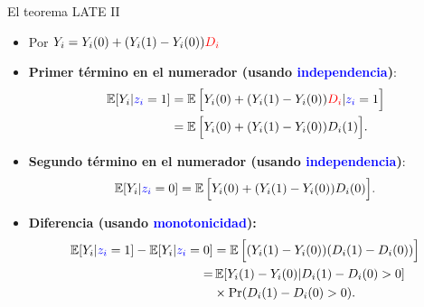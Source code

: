 \documentclass[10pt, xcolor=dvipsnames]{beamer}
\begin{document}
\begin{frame}{El teorema LATE II}\label{ANEX:TEOR-LATE2}
\begin{itemize}
    \item Por \text{\textbf{\textcolor{blue}{restricción de exclusión}}} \(Y_i = Y_i(0)+ (Y_i(1)-Y_i(0))\textcolor{red}{D_i} \)
    \vspace{1em}
    \item \textbf{Primer término en el numerador (usando \textcolor{blue}{independencia})}:
    {\small
    \begin{align}
    \begin{split}
    \operatorname{\mathbb{E}}[Y_i|\textcolor{blue}{z_i} =1] &= \operatorname{\mathbb{E}}\Big[Y_i(0)+ (Y_i(1)-Y_i(0))\textcolor{red}{D_i}|\textcolor{blue}{z_i} =1\Big] \\
    &= \operatorname{\mathbb{E}}\Big[Y_i(0)+ (Y_i(1)-Y_i(0)) D_i(1)\Big]. \\
    \end{split}
    \end{align}
    }
    \item \textbf{Segundo término en el numerador (usando \textcolor{blue}{independencia})}:
    {\small
    \begin{align}
    \begin{split}
    \operatorname{\mathbb{E}}[Y_i|\textcolor{blue}{z_i} =0] &= \operatorname{\mathbb{E}}\Big[Y_i(0)+ (Y_i(1)-Y_i(0))D_i(0)\Big]. \\
    \end{split}
    \end{align}
    }
    \item \textbf{Diferencia (usando \textcolor{blue}{monotonicidad}):} 
    {\small
    \begin{align}
    \begin{split}
    \operatorname{\mathbb{E}}[Y_i|\textcolor{blue}{z_i} =1] - \operatorname{\mathbb{E}}[Y_i|\textcolor{blue}{z_i} =0] &= \operatorname{\mathbb{E}}\Big[(Y_i(1)-Y_i(0))(D_i(1)-D_i(0))\Big] \\ =&\operatorname{\mathbb{E}}[Y_i(1)-Y_i(0)|D_i(1)-D_i(0) > 0] \\ &\times \Pr(D_i(1)-D_i(0) > 0).
    \end{split}
    \end{align}
    }
\end{itemize}
\end{frame}
\end{document}
